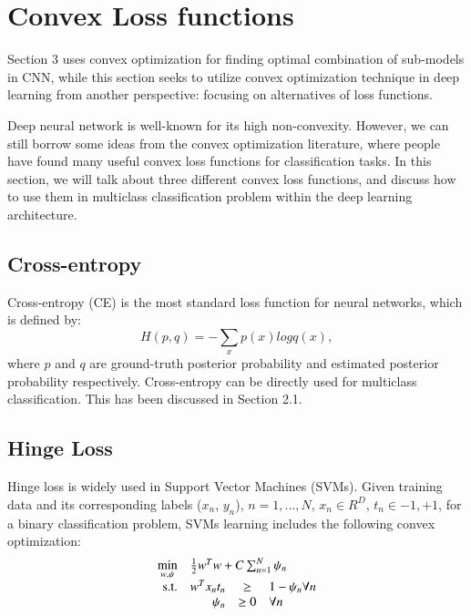 \documentclass{article} %
\begin{document}
\section{Convex Loss functions}
Section 3 uses convex optimization for finding optimal combination of sub-models in CNN, while this section seeks to utilize convex optimization technique in deep learning from another perspective: focusing on alternatives of loss functions.
\par
Deep neural network is well-known for its high non-convexity. However, we can still borrow some ideas from the convex optimization literature, where people have found many useful convex loss functions for classification tasks. In this section, we will talk about three different convex loss functions, and discuss how to use them in multiclass classification problem within the deep learning architecture.


\subsection{Cross-entropy}
Cross-entropy (CE) is the most standard loss function for neural networks, which is defined by:
\begin{equation}
H(p,q) = - \sum_{x}p(x)log q(x),
\end{equation}
where $p$ and $q$ are ground-truth posterior probability and estimated posterior probability respectively. Cross-entropy can be directly used for multiclass classification. This has been discussed in Section 2.1. 

\subsection{Hinge Loss}
Hinge loss is widely used in Support Vector Machines (SVMs). Given training data and its corresponding labels ($x_{n}$, $y_{n}$), $n=1,...,N$, $x_{n} \in R^{D}$, $t_{n} \in {-1,+1}$, for a binary classification problem, SVMs learning includes the following convex optimization:
\begin{equation}
\begin{array}{rrclcl}
\displaystyle \min_{w,\psi} & \multicolumn{3}{l}{ \frac{1}{2} w^{T}w +   C\sum_{n=1}^{N}\psi_{n}}\\
\textrm{s.t.} & w^{T}x_{n}t_{n}& \geq & 1-\psi_{n}  \forall n\\
&\psi_{n} & \geq 0& \forall n \\
\end{array}
\end{equation}
\end{document}
